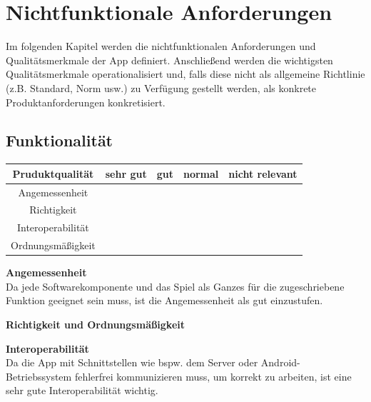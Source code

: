\documentclass[parskip=full]{scrartcl}
\begin{document}
\section{Nichtfunktionale Anforderungen}
Im folgenden Kapitel werden die nichtfunktionalen Anforderungen und Qualitätsmerkmale der App definiert.
Anschließend werden die wichtigsten Qualitätsmerkmale operationalisiert und, falls diese nicht als allgemeine Richtlinie (z.B. Standard, Norm usw.) zu Verfügung gestellt werden,
als konkrete Produktanforderungen konkretisiert.

\subsection{Funktionalität}
\begin{tabular}{| c | c | c | c | c |}
    \hline
    \textbf{Pruduktqualität} & \textbf{sehr gut} & \textbf{gut} & \textbf{normal} & \textbf{nicht relevant} \\ \hline
    Angemessenheit           &                   &              &                 &                         \\ \hline
    Richtigkeit              &                   &              &                 &                         \\ \hline
    Interoperabilität        &                   &              &                 &                         \\ \hline
    Ordnungsmäßigkeit        &                   &              &                 &                         \\ \hline
\end{tabular}

\textbf{Angemessenheit}\\
Da jede Softwarekomponente und das Spiel als Ganzes für die zugeschriebene Funktion geeignet sein muss, ist die Angemessenheit als gut einzustufen.

\textbf{Richtigkeit und Ordnungsmäßigkeit}

\textbf{Interoperabilität}\\
Da die App mit Schnittstellen wie bspw. dem Server oder Android-Betriebssystem fehlerfrei kommunizieren muss, um korrekt zu arbeiten, ist eine sehr gute Interoperabilität wichtig.
\end{document}
